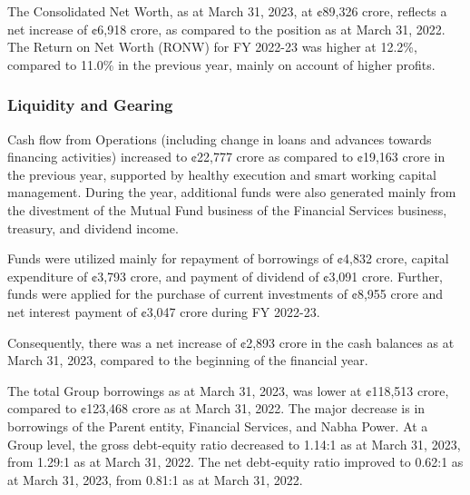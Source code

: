 The Consolidated Net Worth, as at March 31, 2023, at ¢89,326 crore, reflects a net increase of ¢6,918 crore, as compared to the position as at March 31, 2022. The Return on Net Worth (RONW) for FY 2022-23 was higher at 12.2\%, compared to 11.0\% in the previous year, mainly on account of higher profits.

\subsubsection{Liquidity and Gearing}

Cash flow from Operations (including change in loans and advances towards financing activities) increased to ¢22,777 crore as compared to ¢19,163 crore in the previous year, supported by healthy execution and smart working capital management. During the year, additional funds were also generated mainly from the divestment of the Mutual Fund business of the Financial Services business, treasury, and dividend income.

Funds were utilized mainly for repayment of borrowings of ¢4,832 crore, capital expenditure of ¢3,793 crore, and payment of dividend of ¢3,091 crore. Further, funds were applied for the purchase of current investments of ¢8,955 crore and net interest payment of ¢3,047 crore during FY 2022-23.

Consequently, there was a net increase of ¢2,893 crore in the cash balances as at March 31, 2023, compared to the beginning of the financial year.

The total Group borrowings as at March 31, 2023, was lower at ¢118,513 crore, compared to ¢123,468 crore as at March 31, 2022. The major decrease is in borrowings of the Parent entity, Financial Services, and Nabha Power. At a Group level, the gross debt-equity ratio decreased to 1.14:1 as at March 31, 2023, from 1.29:1 as at March 31, 2022. The net debt-equity ratio improved to 0.62:1 as at March 31, 2023, from 0.81:1 as at March 31, 2022.

